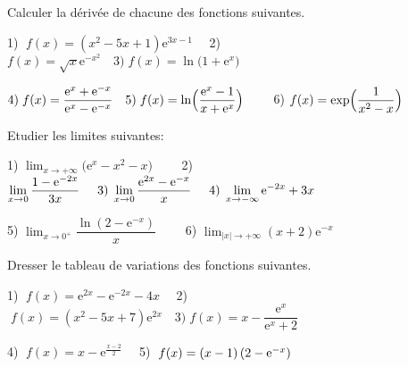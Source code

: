 \begin{exercice}
Calculer la dérivée de chacune des fonctions suivantes.

\medskip

1) $\; f(x)=(x^2-5x+1)\text{e}^{3x-1}\quad  $  2) $ f(x)=\sqrt{x}\text{e}^{-x^2} \quad
3) \; f(x)=\ln \bigl(1+\text{e}^{x}\bigr)\quad $

$   4) \; f(x)= \dfrac{\text{e}^{x}+\text{e}^{-x}} {\text{e}^{x}-\text{e}^{-x}} \quad
  5) \; f(x)= \ln\Bigl(\dfrac{\text{e}^{x}-1} {x+\text{e}^{x}}\Bigr)\qquad $  6) $ f(x)=\text{exp}\Bigr ( \dfrac{1}{x^2-x}\Bigl) $ 
\end{exercice}
\begin{exercice}
Etudier les limites suivantes:
\medskip

  1) $\displaystyle \lim_{x \to +\infty} {\bigl(\text{e}^{x}-x^2-x \bigr)}\qquad $ 2) $\displaystyle \lim_{x \to 0} \dfrac{1-\text{e}^{-2x}}{3x}   
   \hspace*{0.5cm}
    3) \; \displaystyle \lim_{x \to 0} \dfrac{\text{e}^{2x}-\text{e}^{-x}}{x}  \hspace*{0.5cm} 
   4) \; \displaystyle\lim_{x \to-\infty }\text{e}^{-2x}+3x  $ \medskip
 
 
  5) $ \displaystyle\lim_{x \to 0^{+} }\dfrac{\ln(2-\text{e}^{-x})}{x} \qquad $ 
   6) $ \displaystyle\lim_{|x| \to +\infty }(x+2)\text{e}^{-x}  $ 
\end{exercice}

\begin{exercice}
Dresser le tableau de variations  des fonctions suivantes.\medskip

1) $ \;f(x)=\text{e}^{2x}-\text{e}^{-2x}-4x \quad $  2) $\; f(x)= (x^2-5x+7)\text{e}^{2x} \quad
 3)  \;f(x)= x-\dfrac{\text{e}^{x}}{\text{e}^{x}+2}$   
 
4) $ \;f(x)=x- \text{e}^{\frac{x-2}{2} }\quad $    5) $\; f(x)= (x-1)\left(2-\text{e}^{-x}\right)$
\end{exercice}



